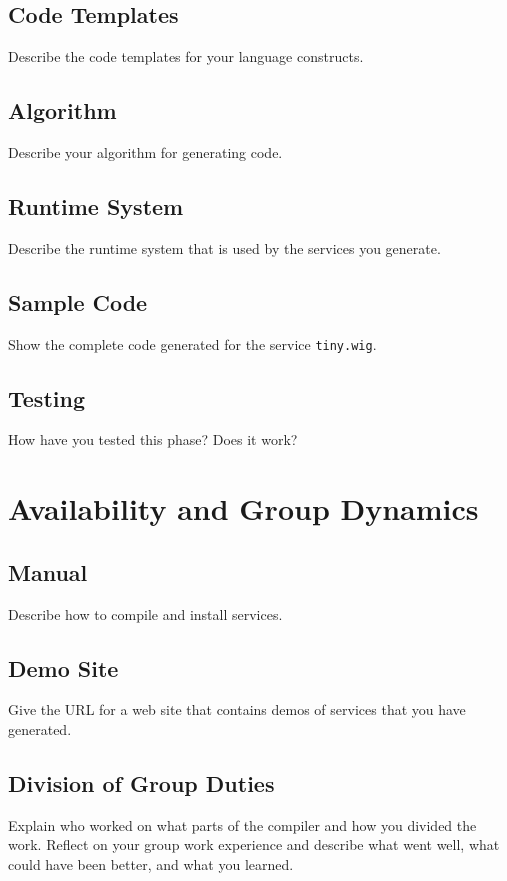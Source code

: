 \documentclass{WigReport}
\begin{document}
\subsection{Code Templates}
Describe the code templates for your language constructs.

\subsection{Algorithm}
Describe your algorithm for generating code.

\subsection{Runtime System}
Describe the runtime system that is used by the services you generate.

\subsection{Sample Code}
Show the complete code generated for the service {\tt tiny.wig}.

\subsection{Testing}
How have you tested this phase? Does it work?

\section{Availability and Group Dynamics}
\subsection{Manual}
Describe how to compile and install services.

\subsection{Demo Site}
Give the URL for a web site that contains demos of 
services that you have generated.

\subsection{Division of Group Duties}
Explain who worked on what parts of the compiler and how you divided
the work.  Reflect on your group work experience and describe what
went well, what could have been better, and what you learned.
\end{document}
